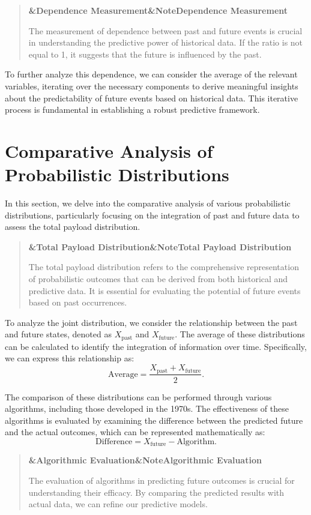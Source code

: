 \documentclass[a4paper]{article}
\newcommand{\boxheading}[1]{%
  \par\smallskip
  \noindent\textbf{\ifx&#1&Note\else#1\fi}\par
  \smallskip
}
\newenvironment{defbox}[1][]{%
  \begin{quote}\color{green!40!black}\boxheading{#1}\normalcolor
}{\end{quote}}
\newenvironment{rembox}[1][]{%
  \begin{quote}\color{black!70}\boxheading{#1}\normalcolor
}{\end{quote}}
\begin{document}
\begin{rembox}[Dependence Measurement]
The measurement of dependence between past and future events is crucial in understanding the predictive power of historical data. If the ratio is not equal to 1, it suggests that the future is influenced by the past.
\end{rembox}

To further analyze this dependence, we can consider the average of the relevant variables, iterating over the necessary components to derive meaningful insights about the predictability of future events based on historical data. This iterative process is fundamental in establishing a robust predictive framework.

\section{Comparative Analysis of Probabilistic Distributions}
In this section, we delve into the comparative analysis of various probabilistic distributions, particularly focusing on the integration of past and future data to assess the total payload distribution.

\begin{defbox}[Total Payload Distribution]
The total payload distribution refers to the comprehensive representation of probabilistic outcomes that can be derived from both historical and predictive data. It is essential for evaluating the potential of future events based on past occurrences.
\end{defbox}

To analyze the joint distribution, we consider the relationship between the past and future states, denoted as \( X_{\text{past}} \) and \( X_{\text{future}} \). The average of these distributions can be calculated to identify the integration of information over time. Specifically, we can express this relationship as:
\[
\text{Average} = \frac{X_{\text{past}} + X_{\text{future}}}{2}.
\]

The comparison of these distributions can be performed through various algorithms, including those developed in the 1970s. The effectiveness of these algorithms is evaluated by examining the difference between the predicted future and the actual outcomes, which can be represented mathematically as:
\[
\text{Difference} = X_{\text{future}} - \text{Algorithm}.
\]

\begin{rembox}[Algorithmic Evaluation]
The evaluation of algorithms in predicting future outcomes is crucial for understanding their efficacy. By comparing the predicted results with actual data, we can refine our predictive models.
\end{rembox}
\end{document}
